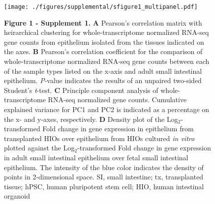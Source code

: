\documentclass[9pt,lineo]{elife}
\date{\today}
\title{}
\begin{document}
\begin{figure}
\begin{fullwidth}
 \centering\texttt{[image: ./figures/supplemental/sfigure1\_multipanel.pdf]}
 \caption*{\textbf{Figure 1 - Supplement 1. }\textbf{A} Pearson's correlation matrix with heirarchical clustering for whole-transcriptome normalized RNA-seq gene counts from epithelium isolated from the tissues indicated on the axes. \textbf{B} Pearson's correlation coefficient for the comparison of whole-transcriptome normalized RNA-seq gene counts between each of the sample types listed on the x-axis and adult small intestinal epithelium. \textit{P}-value indicates the results of an unpaired two-sided Student's \textit{t}-test. \textbf{C} Principle component analysis of whole-transcriptome RNA-seq normalized gene counts. Cumulative explained variance for PC1 and PC2 is indicated as a percentage on the x- and y-axes, respectively. \textbf{D} Density plot of the Log$_{2}$-transformed Fold change in gene expression in epithelium from transplanted HIOs over epithelium from HIOs cultured \textit{in vitro} plotted against the Log$_{2}$-transformed Fold change in gene expression in adult small intestinal epithelium over fetal small intestinal epithelium. The intensity of the blue color indicates the density of points in 2-dimensional space. SI, small intestine; tx, transplanted tissue; hPSC, human pluripotent stem cell; HIO, human intestinal organoid}
\label{fig:fullwidth}
\end{fullwidth}
\end{figure}
\end{document}
